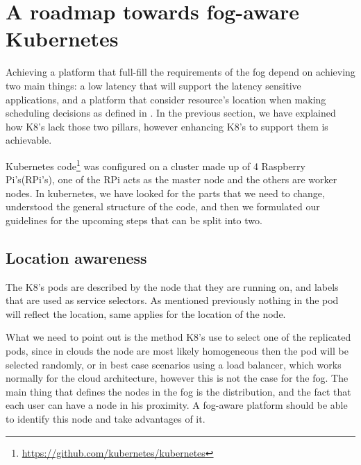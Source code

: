 \documentclass[letterpaper,twocolumn,10pt]{article}
\begin{document}
\section{A roadmap towards fog-aware Kubernetes}\label{sec:road}

Achieving a platform that full-fill the requirements of the fog depend on achieving two main things: a low latency that will support the latency sensitive applications, and a platform that consider resource's location when making scheduling decisions as defined in \cite{bonomi2014}. In the previous section, we have explained how K8's lack those two pillars, however enhancing K8's to support them is achievable.

Kubernetes code\footnote{\url{https://github.com/kubernetes/kubernetes}} was configured on a cluster made up of 4 Raspberry Pi's(RPi's), one of the RPi acts as the master node and the others are worker nodes. In kubernetes, we have looked for the parts that we need to change, understood the general structure of the code, and then we formulated our guidelines for the upcoming steps that can be split into two. 
 
\subsection{Location awareness}

The K8's pods are described by the node that they are running on, and labels that are used as service selectors. As mentioned previously nothing in the pod will reflect the location, same applies for the location of the node. 

What we need to point out is the method K8's use to select one of the replicated pods, since in clouds the node are most likely homogeneous then the pod will be selected randomly, or in best case scenarios using a load balancer, which works normally for the cloud architecture, however this is not the case for the fog. The main thing that defines the nodes in the fog is the distribution, and the fact that each user can have a node in his proximity. A fog-aware platform should be able to identify this node and take advantages of it. 
\end{document}

